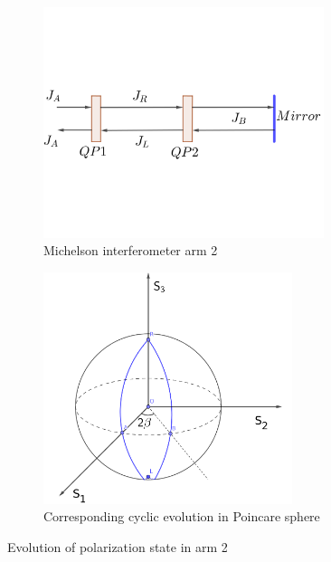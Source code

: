 \documentclass[11pt,a4paper]{article}
\numberwithin{equation}{section}
\begin{document}
 \begin{figure}[H]
 	\begin{subfigure}[H]{0.48\textwidth}
 		\centering
 		\includegraphics[width=0.9\textwidth]{MI arm.png}
 		\caption{Michelson interferometer arm 2}
 		\label{fig:pancha a}
 	\end{subfigure}
 	\hfil
 	\begin{subfigure}[H]{0.48\textwidth}
 		\centering
 		\includegraphics[width=0.8\textwidth]{poincare-pb.png}
 		\caption{Corresponding cyclic evolution in Poincare sphere}
 		\label{fig:pancha b}
 	\end{subfigure}
 	\caption{Evolution of polarization state in arm 2}
 	\label{fig:pancha}
 \end{figure}
 
\end{document}
